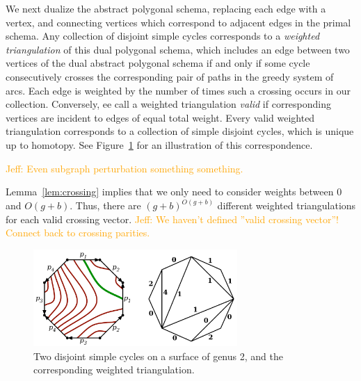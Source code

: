 \documentclass[letterpaper,review]{siamart190516}
\def\rnote#1{\color{red}Review: #1 \color{black}}
\def\jnote#1{\textcolor{orange}{Jeff: #1}}
\begin{document}
We next dualize the abstract polygonal schema, replacing each edge with a vertex, and connecting vertices which correspond to adjacent edges in the primal schema.
%
Any collection of disjoint simple cycles corresponds to a \emph{weighted triangulation} \cite{ccelw-scsih-08} of this dual polygonal schema, which includes an edge between two vertices of the dual abstract polygonal schema if and only if some cycle consecutively crosses the corresponding pair of paths in the greedy system of arcs.  Each edge is weighted by the number of times such a crossing occurs in our collection.  Conversely, ee call a weighted triangulation \emph{valid} if corresponding vertices are incident to edges of equal total weight.  Every valid weighted triangulation corresponds to a collection of simple disjoint cycles, which is unique up to homotopy.  See Figure~\ref{fig:weightedtriangulation} for an illustration of this correspondence.


\jnote{Even subgraph perturbation something something.}

Lemma~\ref{lem:crossing} implies that we only need to consider weights between 0 and $O(g+b)$.  Thus, there are $(g+b)^{O(g+b)}$ different weighted triangulations for each valid crossing vector.  \jnote{We haven’t defined ”valid crossing vector”!  Connect back to crossing parities.}

\begin{figure}[htb]
\centering\includegraphics[height=1.45in]{Fig/triangulation}
\caption{Two disjoint simple cycles on a surface of genus 2, and the corresponding weighted triangulation.}
\label{fig:weightedtriangulation}
\end{figure}
\end{document}
